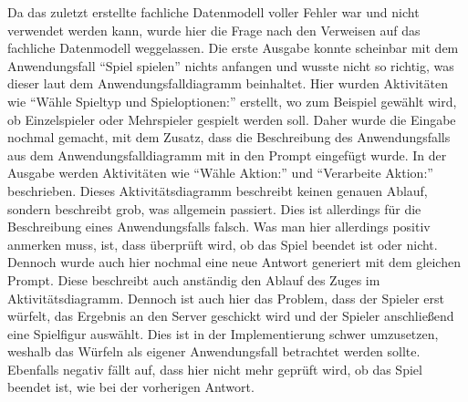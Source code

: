 Da das zuletzt erstellte fachliche Datenmodell voller Fehler war und nicht verwendet werden kann, wurde hier die Frage nach den Verweisen 
auf das fachliche Datenmodell weggelassen. Die erste Ausgabe konnte scheinbar mit dem Anwendungsfall ``Spiel spielen'' nichts anfangen und 
wusste nicht so richtig, was dieser laut dem Anwendungsfalldiagramm beinhaltet. Hier wurden Aktivitäten wie ``Wähle Spieltyp und Spieloptionen:'' 
erstellt, wo zum Beispiel gewählt wird, ob Einzelspieler oder Mehrspieler gespielt werden soll. Daher wurde die Eingabe nochmal gemacht, 
mit dem Zusatz, dass die Beschreibung des Anwendungsfalls aus dem Anwendungsfalldiagramm mit in den Prompt eingefügt wurde. In der Ausgabe 
werden Aktivitäten wie ``Wähle Aktion:'' und ``Verarbeite Aktion:'' beschrieben. Dieses Aktivitätsdiagramm beschreibt keinen genauen Ablauf, 
sondern beschreibt grob, was allgemein passiert. Dies ist allerdings für die Beschreibung eines Anwendungsfalls falsch. Was man hier allerdings 
positiv anmerken muss, ist, dass überprüft wird, ob das Spiel beendet ist oder nicht. Dennoch wurde auch hier nochmal eine neue Antwort 
generiert mit dem gleichen Prompt. Diese beschreibt auch anständig den Ablauf des Zuges im Aktivitätsdiagramm. Dennoch ist auch hier das 
Problem, dass der Spieler erst würfelt, das Ergebnis an den Server geschickt wird und der Spieler anschließend eine Spielfigur auswählt. 
Dies ist in der Implementierung schwer umzusetzen, weshalb das Würfeln als eigener Anwendungsfall betrachtet werden sollte. Ebenfalls 
negativ fällt auf, dass hier nicht mehr geprüft wird, ob das Spiel beendet ist, wie bei der vorherigen Antwort.

